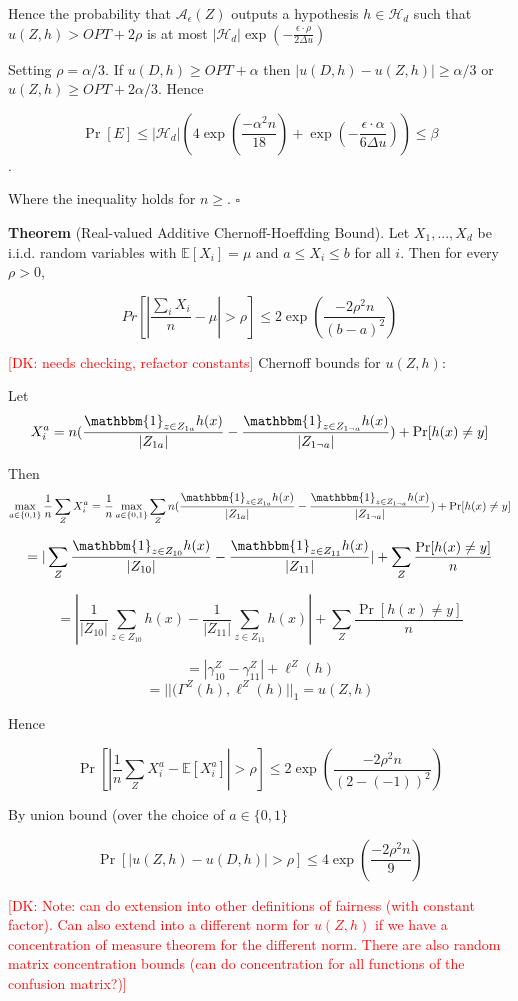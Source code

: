 \documentclass[format = sigconf]{acmart}
\newcommand{\dk}[1]{\textcolor{red}{[DK: #1]}}
\newcommand{\A}{\mathcal{A}}
\renewcommand{\H}{\mathcal{H}}
\newcommand{\1}{\mathbbm{1}}
\theoremstyle{definition}
\begin{document}
Hence the probability that $\A_\epsilon(Z)$ outputs a hypothesis $h \in \H_d$ such that $u(Z,h) > OPT + 2\rho$ is at most $|\H_d|\exp(-\frac{\epsilon\cdot\rho}{2\Delta u})$

Setting $\rho = \alpha/3$. If $u(D,h) \geq OPT + \alpha$ then $|u(D,h) - u(Z,h)| \geq \alpha/3$ or $u(Z,h) \geq OPT + 2\alpha/3$. Hence

$$\Pr[E] \leq |\H_d|(4\exp(\frac{-\alpha^2n}{18}) + \exp(-\frac{\epsilon\cdot\alpha}{6\Delta u})) \leq \beta$$.

Where the inequality holds for $n \geq $. $\square$

{\bf Theorem} (Real-valued Additive Chernoff-Hoeffding Bound). Let $X_1,...,X_d$ be i.i.d. random variables with $\mathbb{E}[X_i] = \mu$ and $a \leq X_i \leq b$ for all $i$. Then for every $\rho > 0$,

$$Pr[|\frac{\sum_i X_i}{n} - \mu| > \rho] \leq 2\exp(\frac{-2\rho^2n}{(b-a)^2})$$

\dk {needs checking, refactor constants}
Chernoff bounds for $u(Z,h)$:

Let $$X_i^a = n(\frac{\1_{z\in Z_{1a}}h(x)}{|Z_{1a}|} - \frac{\1_{z\in Z_{1\neg a}}h(x)}{|Z_{1 \neg a}|} ) + \Pr[h(x) \neq y]$$

Then $$\max_{a\in \{0,1\}}\frac{1}{n} \sum_Z X_i^a =\frac{1}{n}  \max_{a\in \{0,1\}} \sum_Z n(\frac{\1_{z\in Z_{1a}}h(x)}{|Z_{1a}|} - \frac{\1_{z\in Z_{1\neg a}}h(x)}{|Z_{1 \neg a}|} ) + \Pr[h(x) \neq y]$$

$$= |\sum_Z \frac{\1_{z\in Z_{10}}h(x)}{|Z_{10}|} - \frac{\1_{z\in Z_{11}}h(x)}{|Z_{11}|}| +  \sum_Z \frac{\Pr[h(x) \neq y] }{n}$$

$$= |\frac{1}{|Z_{10}|} \sum_{z\in Z_{10}} h(x) - \frac{1}{|Z_{11}|} \sum_{z\in Z_{11}} h(x)| +  \sum_Z \frac{\Pr[h(x) \neq y] }{n}$$

$$=|\gamma_{10}^Z - \gamma_{11}^Z| + \ell^Z(h) $$
$$=||(\Gamma^Z(h), \ell^Z(h)||_{1} = u(Z,h)$$

Hence

$$\Pr[|\frac{1}{n} \sum_Z X_i^a - \mathbb{E}[X_i^a]| > \rho] \leq 2\exp(\frac{-2\rho^2n}{(2-(-1))^2})$$

By union bound (over the choice of $a \in \{0,1\}$

$$\Pr[|u(Z,h) - u(D,h)| > \rho] \leq 4\exp(\frac{-2\rho^2n}{9})$$

\dk {Note: can do extension into other definitions of fairness (with constant factor).
Can also extend into a different norm for $u(Z,h)$ if we have a concentration of measure theorem for the different norm. There are also random matrix concentration bounds (can do concentration for all functions of the confusion matrix?)}
\end{document}
